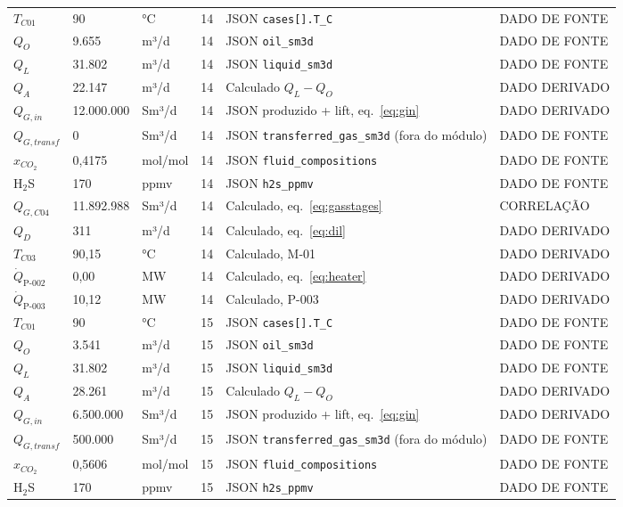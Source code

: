 \documentclass[11pt,a4paper]{article}
\numberwithin{equation}{section}
\numberwithin{table}{section}
\numberwithin{figure}{section}
\newcommand{\tipo}[1]{\textsf{\footnotesize #1}}
\begin{document}
{\begin{longtable}{L{3.6cm}L{2.2cm}lL{1.0cm}L{4.2cm}l}
$T_{C01}$ & 90 & °C & 14 & JSON \texttt{cases[].T\_C} & \tipo{DADO DE FONTE}\\
$Q_{O}$ & 9.655 & m³/d & 14 & JSON \texttt{oil\_sm3d} & \tipo{DADO DE FONTE}\\
$Q_{L}$ & 31.802 & m³/d & 14 & JSON \texttt{liquid\_sm3d} & \tipo{DADO DE FONTE}\\
$Q_{A}$ & 22.147 & m³/d & 14 & Calculado $Q_L-Q_O$ & \tipo{DADO DERIVADO}\\
$Q_{G,in}$ & 12.000.000 & Sm³/d & 14 & JSON produzido + lift, eq.~\eqref{eq:gin} & \tipo{DADO DERIVADO}\\
$Q_{G,transf}$ & 0 & Sm³/d & 14 & JSON \texttt{transferred\_gas\_sm3d} (fora do módulo) & \tipo{DADO DE FONTE}\\
$x_{CO_2}$ & 0{,}4175 & mol/mol & 14 & JSON \texttt{fluid\_compositions} & \tipo{DADO DE FONTE}\\
H$_2$S & 170 & ppmv & 14 & JSON \texttt{h2s\_ppmv} & \tipo{DADO DE FONTE}\\
$Q_{G,C04}$ & 11.892.988 & Sm³/d & 14 & Calculado, eq.~\eqref{eq:gasstages} & \tipo{CORRELAÇÃO}\\
$Q_{D}$ & 311 & m³/d & 14 & Calculado, eq.~\eqref{eq:dil} & \tipo{DADO DERIVADO}\\
$T_{C03}$ & 90,15 & °C & 14 & Calculado, M-01 & \tipo{DADO DERIVADO}\\
$\dot Q_{\mbox{P-002}}$ & 0,00 & MW & 14 & Calculado, eq.~\eqref{eq:heater} & \tipo{DADO DERIVADO}\\
$\dot Q_{\mbox{P-003}}$ & 10,12 & MW & 14 & Calculado, P-003 & \tipo{DADO DERIVADO}\\
$T_{C01}$ & 90 & °C & 15 & JSON \texttt{cases[].T\_C} & \tipo{DADO DE FONTE}\\
$Q_{O}$ & 3.541 & m³/d & 15 & JSON \texttt{oil\_sm3d} & \tipo{DADO DE FONTE}\\
$Q_{L}$ & 31.802 & m³/d & 15 & JSON \texttt{liquid\_sm3d} & \tipo{DADO DE FONTE}\\
$Q_{A}$ & 28.261 & m³/d & 15 & Calculado $Q_L-Q_O$ & \tipo{DADO DERIVADO}\\
$Q_{G,in}$ & 6.500.000 & Sm³/d & 15 & JSON produzido + lift, eq.~\eqref{eq:gin} & \tipo{DADO DERIVADO}\\
$Q_{G,transf}$ & 500.000 & Sm³/d & 15 & JSON \texttt{transferred\_gas\_sm3d} (fora do módulo) & \tipo{DADO DE FONTE}\\
$x_{CO_2}$ & 0{,}5606 & mol/mol & 15 & JSON \texttt{fluid\_compositions} & \tipo{DADO DE FONTE}\\
H$_2$S & 170 & ppmv & 15 & JSON \texttt{h2s\_ppmv} & \tipo{DADO DE FONTE}\\

\end{longtable}}
\end{document}
